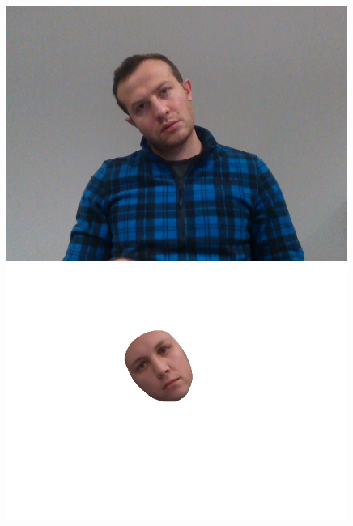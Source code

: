 \begin{figure}[h]
    \begin{minipage}{.325\textwidth}
      \centering
      \includegraphics[width=0.99\textwidth]{Figures/dataset/target/6.png}
    \end{minipage}
    \begin{minipage}{.325\textwidth}
      \centering
      \includegraphics[width=0.99\textwidth]{Figures/dataset/our/6.png}
    \end{minipage}
    \begin{minipage}{.325\textwidth}
      \centering

\end{minipage}
\end{figure}
